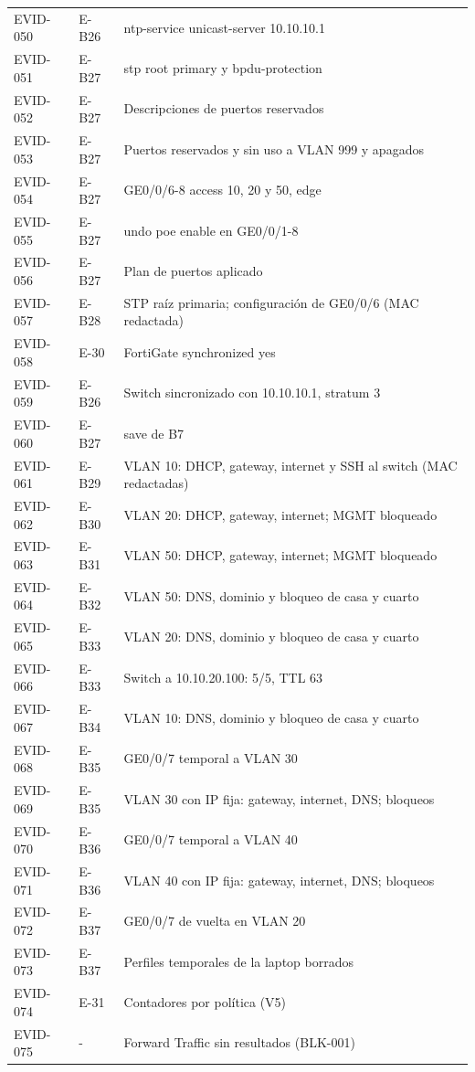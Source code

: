 \documentclass[11pt,a4paper]{article}
\begin{document}
{\begin{longtable}{L{1.6cm} L{2.1cm} L{11.6cm}}
  EVID-050 & E-B26 & ntp-service unicast-server 10.10.10.1\\
  EVID-051 & E-B27 & stp root primary y bpdu-protection\\
  EVID-052 & E-B27 & Descripciones de puertos reservados\\
  EVID-053 & E-B27 & Puertos reservados y sin uso a VLAN 999 y apagados\\
  EVID-054 & E-B27 & GE0/0/6-8 access 10, 20 y 50, edge\\
  EVID-055 & E-B27 & undo poe enable en GE0/0/1-8\\
  EVID-056 & E-B27 & Plan de puertos aplicado\\
  EVID-057 & E-B28 & STP raíz primaria; configuración de GE0/0/6 (MAC redactada)\\
  EVID-058 & E-30 & FortiGate synchronized yes\\
  EVID-059 & E-B26 & Switch sincronizado con 10.10.10.1, stratum 3\\
  EVID-060 & E-B27 & save de B7\\
  EVID-061 & E-B29 & VLAN 10: DHCP, gateway, internet y SSH al switch (MAC redactadas)\\
  EVID-062 & E-B30 & VLAN 20: DHCP, gateway, internet; MGMT bloqueado\\
  EVID-063 & E-B31 & VLAN 50: DHCP, gateway, internet; MGMT bloqueado\\
  EVID-064 & E-B32 & VLAN 50: DNS, dominio y bloqueo de casa y cuarto\\
  EVID-065 & E-B33 & VLAN 20: DNS, dominio y bloqueo de casa y cuarto\\
  EVID-066 & E-B33 & Switch a 10.10.20.100: 5/5, TTL 63\\
  EVID-067 & E-B34 & VLAN 10: DNS, dominio y bloqueo de casa y cuarto\\
  EVID-068 & E-B35 & GE0/0/7 temporal a VLAN 30\\
  EVID-069 & E-B35 & VLAN 30 con IP fija: gateway, internet, DNS; bloqueos\\
  EVID-070 & E-B36 & GE0/0/7 temporal a VLAN 40\\
  EVID-071 & E-B36 & VLAN 40 con IP fija: gateway, internet, DNS; bloqueos\\
  EVID-072 & E-B37 & GE0/0/7 de vuelta en VLAN 20\\
  EVID-073 & E-B37 & Perfiles temporales de la laptop borrados\\
  EVID-074 & E-31 & Contadores por política (V5)\\
  EVID-075 & - & Forward Traffic sin resultados (BLK-001)\\

\end{longtable}}
\end{document}
